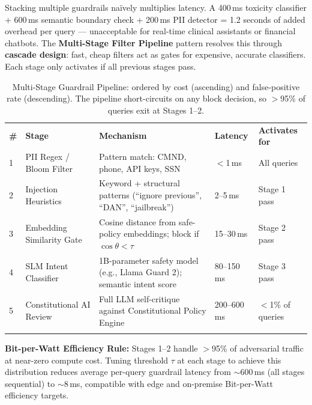 Stacking multiple guardrails naïvely multiplies latency. A 400\,ms toxicity classifier + 600\,ms semantic boundary check + 200\,ms PII detector = 1.2 seconds of added overhead per query — unacceptable for real-time clinical assistants or financial chatbots. The \textbf{Multi-Stage Filter Pipeline} pattern resolves this through \textbf{cascade design}: fast, cheap filters act as gates for expensive, accurate classifiers. Each stage only activates if all previous stages pass.

\begin{table}[ht]
\centering
\caption{Multi-Stage Guardrail Pipeline: ordered by cost (ascending) and false-positive rate (descending). The pipeline short-circuits on any block decision, so $>$95\% of queries exit at Stages 1--2.}
\label{tab:guardrail_pipeline}
\renewcommand{\arraystretch}{1.2}
\begin{tabular}{p{0.35cm} p{2.8cm} p{3.6cm} p{1.5cm} p{2.6cm}}
\hline\noalign{\smallskip}
\textbf{\#} & \textbf{Stage} & \textbf{Mechanism} & \textbf{Latency} & \textbf{Activates for} \\
\noalign{\smallskip}\svhline\noalign{\smallskip}
1 & PII Regex / Bloom Filter & Pattern match: CMND, phone, API keys, SSN & $<$1\,ms & All queries \\[3pt]
2 & Injection Heuristics & Keyword + structural patterns (``ignore previous'', ``DAN'', ``jailbreak'') & 2--5\,ms & Stage 1 pass \\[3pt]
3 & Embedding Similarity Gate & Cosine distance from safe-policy embeddings; block if $\cos\theta < \tau$ & 15--30\,ms & Stage 2 pass \\[3pt]
4 & SLM Intent Classifier & 1B-parameter safety model (e.g., Llama Guard 2); semantic intent score & 80--150\,ms & Stage 3 pass \\[3pt]
5 & Constitutional AI Review & Full LLM self-critique against Constitutional Policy Engine & 200--600\,ms & $<$1\% of queries \\
\noalign{\smallskip}\hline\noalign{\smallskip}
\end{tabular}
\end{table}

\begin{svgraybox}
\textbf{Bit-per-Watt Efficiency Rule:} Stages 1--2 handle $>$95\% of adversarial traffic at near-zero compute cost. Tuning threshold $\tau$ at each stage to achieve this distribution reduces average per-query guardrail latency from $\sim$600\,ms (all stages sequential) to $\sim$8\,ms, compatible with edge and on-premise Bit-per-Watt efficiency targets.
\end{svgraybox}

